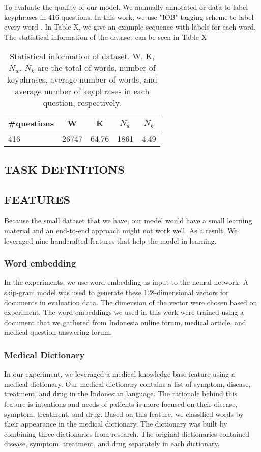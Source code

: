 To evaluate the quality of our model. We manually annotated or data to label keyphrases in 416 questions. In this work, we use "IOB" tagging scheme to label every word \cite{collobert2011natural}. In Table X, we give an example sequence with labels for each word. The statistical information of the dataset can be seen in Table X
\begin{table}
	\caption{Statistical information of dataset. W, K, $\bar{N}_{w}$, $\bar{N}_{k}$ are the total of words, number of keyphrases, average number of words, and average number of keyphrases in each question, respectively.}
	\label{tab:descriptive_stats}
	\begin{tabular}{lcccc}
		\toprule
		\#questions&W&K&$\bar{N}_{w}$&$\bar{N}_{k}$\\
		\midrule
		416 & 26747  & 64.76 & 1861 & 4.49 \\
		
		\bottomrule
	\end{tabular}
\end{table}
\subsection{TASK DEFINITIONS}

\subsection{FEATURES}
Because the small dataset that we have, our model would have a small learning material and an end-to-end approach might not work well. As a result, We leveraged nine handcrafted features that help the model in learning.
\subsubsection{Word embedding\\}
In the experiments, we use word embedding as input to the neural network. A skip-gram model \cite{mikolov2013wordembed} was used to generate these 128-dimensional vectors for documents in evaluation data. The dimension of the vector were chosen based on \cite{skripsiWahid} experiment. The word embeddings we used in this work were trained using a document that we gathered from Indonesia online forum, medical article, and medical question answering forum. 

\subsubsection{Medical Dictionary\\}
In our experiment, we leveraged a medical knowledge base feature using a medical dictionary. Our medical dictionary contains a list of symptom, disease, treatment, and drug in the Indonesian language. The rationale behind this feature is intentions and needs of patients is more focused on their disease, symptom, treatment, and drug. Based on this feature, we classified words by their appearance in the medical dictionary. The dictionary was built by combining three dictionaries from \cite{skripsiKakAbid} research. The original dictionaries contained disease, symptom, treatment, and drug separately in each dictionary.

